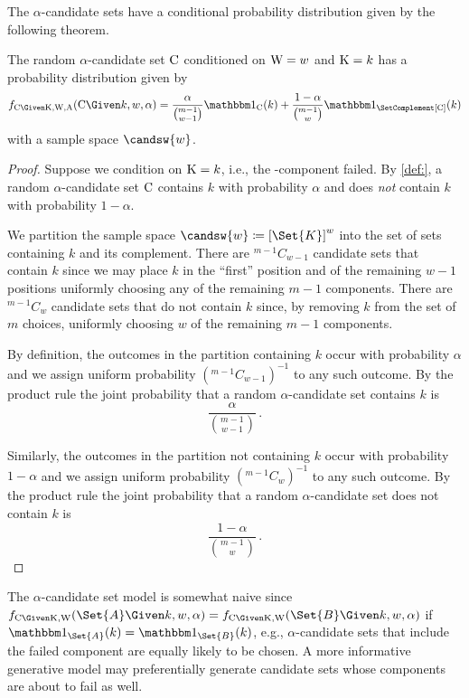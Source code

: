 \documentclass[../main.tex]{subfiles}
\begin{document}
The $\alpha$-candidate sets have a conditional probability distribution given by the following theorem.
\begin{theorem}
	The random $\alpha$-candidate set $\mathrm{C}$ conditioned on $\mathrm{W} = w$ and $\mathrm{K} = k$ has a probability distribution given by
	\begin{equation}
	\pdf_{\rvcand \Given \RV{K}, \RV{W}, \RV{A}}(\cand \Given k, w, \alpha) = \frac{\alpha}{\binom{m-1}{w-1}} \SetIndicator{\cand}(k) + \frac{1-\alpha}{\binom{m-1}{w}} \SetIndicator{\SetComplement[\cand]}(k)
	\end{equation}
	with a sample space $\candsw{w}$.
\end{theorem}
\begin{proof}
	Suppose we condition on $\mathrm{K}=k$, i.e., the \kth-component failed.
	By \cref{def:}, a random $\alpha$-candidate set $\mathrm{C}$ contains $k$ with probability $\alpha$ and does \emph{not} contain $k$ with probability $1-\alpha$.	
	
	We partition the sample space $\candsw{w} \coloneqq \left[\Set{K}\right]^w$ into the set of sets containing $k$ and its complement.
	There are $^{m-1}C_{w-1}$ candidate sets that contain $k$ since we may place $k$ in the ``first'' position and of the remaining $w-1$ positions uniformly choosing any of the remaining $m-1$ components.
	There are $^{m-1}C_w$ candidate sets that do not contain $k$ since, by removing $k$ from the set of $m$ choices, uniformly choosing $w$ of the remaining $m-1$ components.

	By definition, the outcomes in the partition containing $k$ occur with probability $\alpha$ and we assign uniform probability $(^{m-1}C_{w-1})^{-1}$ to any such outcome.
	By the product rule the joint probability that a random $\alpha$-candidate set contains $k$ is
	\begin{equation}
		\frac{\alpha}{\binom{m-1}{w-1}}\,.
	\end{equation}
	
	Similarly, the outcomes in the partition not containing $k$ occur with probability $1-\alpha$ and we assign uniform probability $(^{m-1}C_w)^{-1}$ to any such outcome.
	By the product rule the joint probability that a random $\alpha$-candidate set does not contain $k$ is
	\begin{equation}
		\frac{1-\alpha}{\binom{m-1}{w}}\,.
	\end{equation}
\end{proof}

\begin{remark}
The $\alpha$-candidate set model is somewhat naive since $\pdf_{\rvcand \Given \RV{K}, \RV{W}}(\Set{A} \Given k, w, \alpha) = \pdf_{\rvcand \Given \RV{K}, \RV{W}}(\Set{B} \Given k, w, \alpha)$ if $\SetIndicator{\Set{A}}(k) = \SetIndicator{\Set{B}}(k)$, e.g., $\alpha$-candidate sets that include the failed component are equally likely to be chosen.
A more informative generative model may preferentially generate candidate sets whose components are about to fail as well.
\end{remark}
\end{document}

